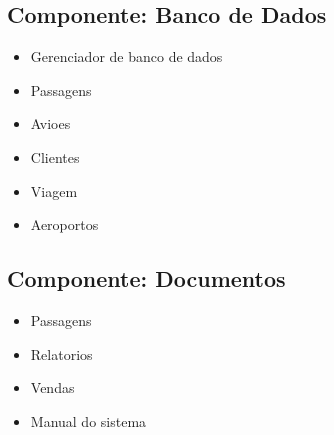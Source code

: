 \subsection{Componente: Banco de Dados}

\begin{itemize}
       \item Gerenciador de banco de dados
       \item Passagens
       \item Avioes
       \item Clientes
       \item Viagem
       \item Aeroportos
\end{itemize}

\subsection{Componente: Documentos }
\begin{itemize}
       \item Passagens
       \item Relatorios
       \item Vendas
       \item Manual do sistema
\end{itemize}

